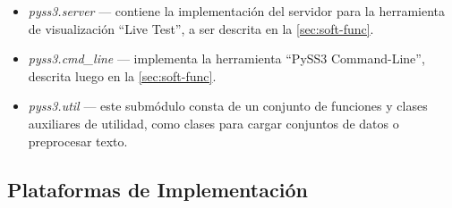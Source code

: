 \begin{itemize}
    \item \emph{pyss3.server} --- contiene la implementación del servidor para la herramienta de visualización ``Live Test'', a ser descrita en la \autoref{sec:soft-func}.
    \item \emph{pyss3.cmd\_line} --- implementa la herramienta ``PySS3 Command-Line'', descrita luego en la \autoref{sec:soft-func}.
    \item \emph{pyss3.util} --- este submódulo consta de un conjunto de funciones y clases auxiliares de utilidad, como clases para cargar conjuntos de datos o preprocesar texto.
\end{itemize}

\subsection{Plataformas de Implementación}

